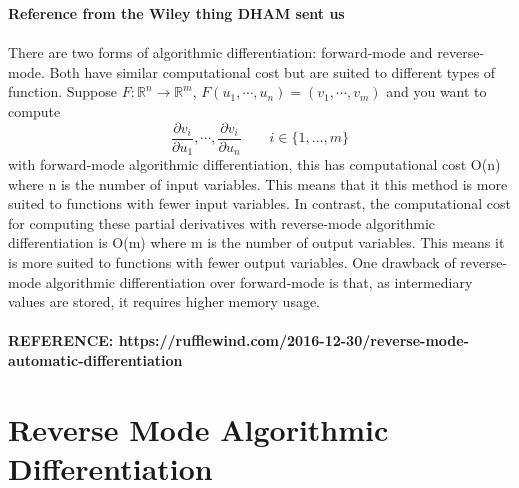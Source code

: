 \documentclass{article}
\begin{document}
\textbf{Reference from the Wiley thing DHAM sent us}
\\\\
There are two forms of algorithmic differentiation: forward-mode and reverse-mode. Both have similar computational cost but are suited to different types of function. Suppose 	$F: \mathbb{R}^n\rightarrow\mathbb{R}^m$, $F(u_1, \cdots, u_n) = (v_1, \cdots, v_m)$ and you want to compute 
\begin{equation}
\frac{\partial v_i}{\partial u_1}, \cdots, \frac{\partial v_i}{\partial u_n} \quad \quad i \in \{1, \ldots, m\}
\end{equation}
with forward-mode algorithmic differentiation, this has computational cost O(n) where n is the number of input variables. This means that it this method is more suited to functions with fewer input variables. In contrast, the computational cost for computing these partial derivatives with reverse-mode algorithmic differentiation is O(m) where m is the number of output variables. This means it is more suited to functions with fewer output variables.
One drawback of reverse-mode algorithmic differentiation over forward-mode is that, as intermediary values are stored, it requires higher memory usage.
\\\\
\textbf{REFERENCE: https://rufflewind.com/2016-12-30/reverse-mode-automatic-differentiation}

\section{Reverse Mode Algorithmic Differentiation}
\end{document}
